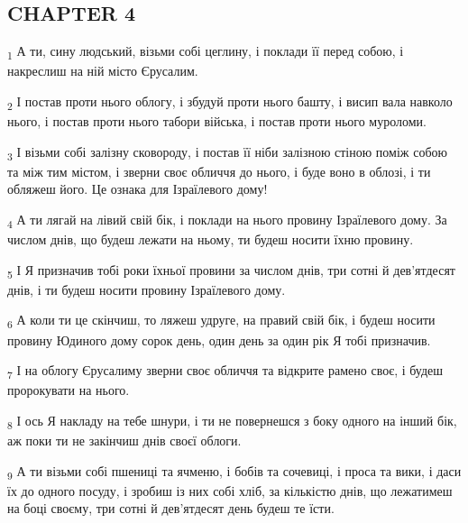 \subsection{CHAPTER 4}
\begin{tcolorbox}
\textsubscript{1} А ти, сину людський, візьми собі цеглину, і поклади її перед собою, і накреслиш на ній місто Єрусалим.
\end{tcolorbox}
\begin{tcolorbox}
\textsubscript{2} І постав проти нього облогу, і збудуй проти нього башту, і висип вала навколо нього, і постав проти нього табори війська, і постав проти нього муроломи.
\end{tcolorbox}
\begin{tcolorbox}
\textsubscript{3} І візьми собі залізну сковороду, і постав її ніби залізною стіною поміж собою та між тим містом, і зверни своє обличчя до нього, і буде воно в облозі, і ти обляжеш його. Це ознака для Ізраїлевого дому!
\end{tcolorbox}
\begin{tcolorbox}
\textsubscript{4} А ти лягай на лівий свій бік, і поклади на нього провину Ізраїлевого дому. За числом днів, що будеш лежати на ньому, ти будеш носити їхню провину.
\end{tcolorbox}
\begin{tcolorbox}
\textsubscript{5} І Я призначив тобі роки їхньої провини за числом днів, три сотні й дев'ятдесят днів, і ти будеш носити провину Ізраїлевого дому.
\end{tcolorbox}
\begin{tcolorbox}
\textsubscript{6} А коли ти це скінчиш, то ляжеш удруге, на правий свій бік, і будеш носити провину Юдиного дому сорок день, один день за один рік Я тобі призначив.
\end{tcolorbox}
\begin{tcolorbox}
\textsubscript{7} І на облогу Єрусалиму зверни своє обличчя та відкрите рамено своє, і будеш пророкувати на нього.
\end{tcolorbox}
\begin{tcolorbox}
\textsubscript{8} І ось Я накладу на тебе шнури, і ти не повернешся з боку одного на інший бік, аж поки ти не закінчиш днів своєї облоги.
\end{tcolorbox}
\begin{tcolorbox}
\textsubscript{9} А ти візьми собі пшениці та ячменю, і бобів та сочевиці, і проса та вики, і даси їх до одного посуду, і зробиш із них собі хліб, за кількістю днів, що лежатимеш на боці своєму, три сотні й дев'ятдесят день будеш те їсти.
\end{tcolorbox}
